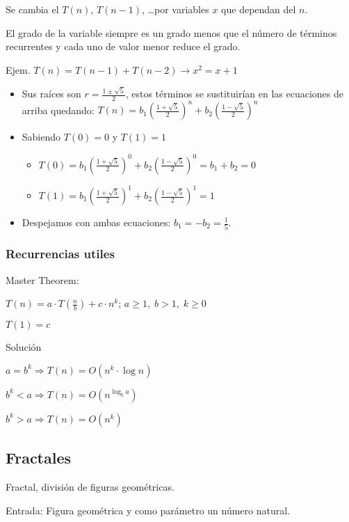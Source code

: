 Se cambia el $T(n)$, $T(n-1)$, \ldots por variables $x$ que dependan del $n$.

El grado de la variable siempre es un grado menos que el número de términos recurrentes y cada uno de valor menor reduce el grado.

Ejem. $T(n)=T(n-1)+T(n-2) \rightarrow x^2= x + 1$
\begin{itemize}
  \item Sus raíces son $r = \frac{1\pm \sqrt{5}}{2}$, estos términos se sustituirían en las ecuaciones de arriba quedando: $T\left(n\right)= b_1\left(\frac{1+ \sqrt{5}}{2}\right)^n + b_2\left(\frac{1- \sqrt{5}}{2}\right)^n$
  \item Sabiendo $T\left(0\right) = 0$ y $T\left(1\right)=1$
  \begin{itemize}
    \item $T\left(0\right)= b_1\left(\frac{1+ \sqrt{5}}{2}\right)^0 + b_2\left(\frac{1- \sqrt{5}}{2}\right)^0 = b_1 + b_2 = 0$
    \item $T\left(1\right)= b_1\left(\frac{1+ \sqrt{5}}{2}\right)^1 + b_2\left(\frac{1- \sqrt{5}}{2}\right)^1 = 1$
  \end{itemize}
  \item Despejamos con ambas ecuaciones: $b_1 = -b_2 = \frac{1}{5}$.
\end{itemize}

\subsubsection{Recurrencias utiles}
Master Theorem:

$T\left(n\right) = a \cdot T\left(\frac{n}{b}\right) + c \cdot n^k$; $a \geq 1,\; b > 1,\; k \geq 0$

$T\left(1\right)=c$

Solución

$a = b^k \Rightarrow T\left(n\right) = O\left(n^{k} \cdot \log n\right)$

$b^k < a \Rightarrow T\left(n\right) = O\left(n^{\log_b a}\right)$

$b^k > a \Rightarrow T\left(n\right) = O\left(n^{k}\right)$

\subsection{Fractales}
Fractal, división de figuras geométricas.

Entrada: Figura geométrica y como parámetro un número natural.

